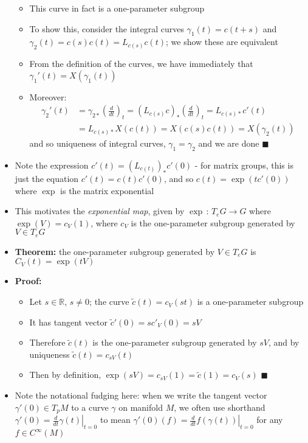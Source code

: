 \documentclass[12pt,a4paper]{article}
\numberwithin{equation}{section}
\begin{document}
\begin{itemize}
\begin{itemize}
			\item This curve in fact is a one-parameter subgroup
			\item To show this, consider the integral curves $\gamma_{1}(t)=c(t+s)$ and $\gamma_{2}(t)=c(s)c(t)=L_{c(s)}c(t)$; we show these are equivalent
			\item From the definition of the curves, we have immediately that $\gamma_{1}'(t)=X(\gamma_{1}(t))$
			\item Moreover:
			$$
			\begin{aligned}
				\gamma_{2}'(t)&=\gamma_{2*}\left(\frac{d}{dt}\right)_{t}=(L_{c(s)}c)_{*}\left(\frac{d}{dt}\right)_{t}=L_{c(s)*}c'(t)\\&=L_{c(s)*}X(c(t))=X(c(s)c(t))=X(\gamma_{2}(t))
			\end{aligned}
			$$
			and so uniqueness of integral curves, $\gamma_{1}=\gamma_{2}$ and we are done $\blacksquare$
		\end{itemize}
		\item Note the expression $c'(t)=(L_{c(t)})_{*}c'(0)$ - for matrix groups, this is just the equation $c'(t)=c(t)c'(0)$, and so $c(t)=\exp(tc'(0))$ where $\exp$ is the matrix exponential
		\item This motivates the \textit{exponential map}, given by $\exp\,:\,T_{e}G\to G$ where $\exp(V)=c_{V}(1)$, where $c_{V}$ is the one-parameter subgroup generated by $V\in T_{e}G$
		\item \textbf{Theorem:} the one-parameter subgroup generated by $V\in T_{e}G$ is $C_{V}(t)=\exp(tV)$
		\item \textbf{Proof:}
		\begin{itemize}
			\item Let $s\in\mathbb{R}$, $s\neq 0$; the curve $\tilde{c}(t)=c_{V}(st)$ is a one-parameter subgroup
			\item It has tangent vector $\tilde{c}'(0)=sc'_{V}(0)=sV$
			\item Therefore $\tilde{c}(t)$ is the one-parameter subgroup generated by $sV$, and by uniqueness $\tilde{c}(t)=c_{sV}(t)$
			\item Then by definition, $\exp(sV)=c_{sV}(1)=\tilde{c}(1)=c_{V}(s)$ $\blacksquare$
		\end{itemize}
		\item Note the notational fudging here: when we write the tangent vector $\gamma'(0)\in T_{p}M$ to a curve $\gamma$ on manifold $M$, we often use shorthand $\gamma'(0)=\left.\frac{d}{dt}\gamma(t)\right\rvert_{t=0}$ to mean $\gamma'(0)(f)=\left.\frac{d}{dt}f(\gamma(t))\right\rvert_{t=0}$ for any $f\in C^{\infty}(M)$

\end{itemize}
\end{document}
